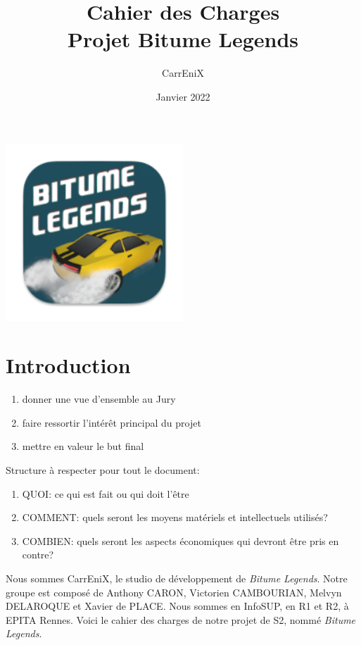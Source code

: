 \documentclass[11pt,a4paper]{article}
\newcommand{\btmlgs}{\textit{Bitume Legends}}
\begin{document}
\title{Cahier des Charges \\ {\large Projet Bitume Legends}}
\author{CarrEniX}
\date{Janvier 2022}
\maketitle

\begin{center}
  \includegraphics[width=0.5\textwidth]{Medias/logo192.png}
\end{center}

\tableofcontents
\clearpage

\section{Introduction}
  \begin{enumerate}
    \item donner une vue d'ensemble au Jury
    \item faire ressortir l'intérêt principal du projet
    \item mettre en valeur le but final
  \end{enumerate}
  Structure à respecter pour tout le document:
  \begin{enumerate}
    \item QUOI: ce qui est fait ou qui doit l'être
    \item COMMENT: quels seront les moyens matériels et intellectuels utilisés?
    \item COMBIEN: quels seront les aspects économiques qui devront être pris en contre?
  \end{enumerate}



  Nous sommes CarrEniX, le studio de développement de \btmlgs. Notre groupe est composé de 
  Anthony CARON, Victorien CAMBOURIAN, Melvyn DELAROQUE et Xavier de PLACE. Nous sommes en InfoSUP, 
  en R1 et R2, à EPITA Rennes. Voici le cahier des charges de notre projet de S2, nommé \btmlgs. 
  
\end{document}
